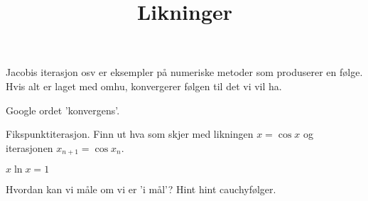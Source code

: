\documentclass[a4paper,norsk,11pt]{interaktiv}
\title{Likninger}
\begin{document}

\maketitle



Jacobis iterasjon osv er eksempler på numeriske metoder som produserer en følge.
Hvis alt er laget med omhu, 
konvergerer følgen til det vi vil ha. 


\begin{oppgave}{1}
Google ordet 'konvergens'.
\end{oppgave}




\begin{oppgave}{2}
Fikspunktiterasjon.
Finn ut hva som skjer med likningen $x=\cos{x}$ og iterasjonen $x_{n+1}=\cos{x_n}$.
\end{oppgave}


\begin{oppgave}{2}
$x\ln x=1$
\end{oppgave}



\begin{oppgave}{3}
Hvordan kan vi måle om vi er 'i mål'? Hint hint cauchyfølger.
\end{oppgave}
\end{document}
